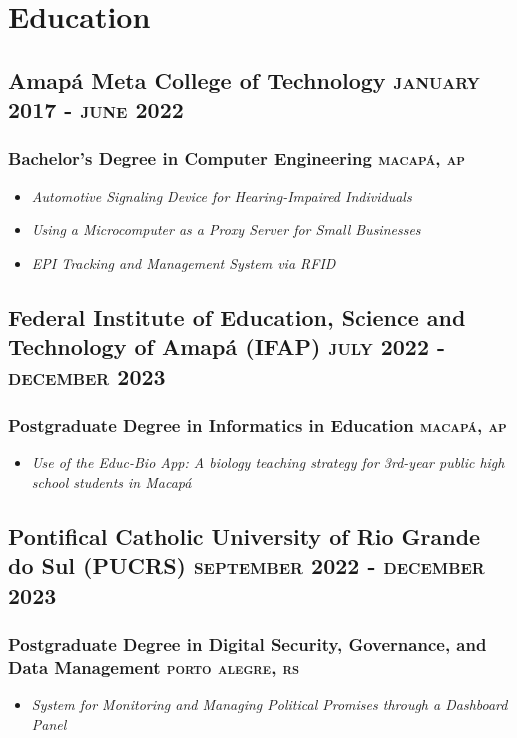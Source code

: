 \documentclass{article}
\newcommand{\rside}[1]{\hfill \normalfont\scshape\MakeLowercase{#1}}
\begin{document}
\section{\faGraduationCap\enspace Education}
\subsection{Amapá Meta College of Technology \rside{January 2017 - June 2022}}
\subsubsection{Bachelor’s Degree in Computer Engineering \rside{Macapá, AP}}
\begin{itemize}
  \item \textit{Automotive Signaling Device for Hearing-Impaired Individuals}
  \item \textit{Using a Microcomputer as a Proxy Server for Small Businesses}
  \item \textit{EPI Tracking and Management System via RFID}
\end{itemize}

\subsection{Federal Institute of Education, Science and Technology of Amapá (IFAP) \rside{July 2022 - December 2023}}
\subsubsection{Postgraduate Degree in Informatics in Education \rside{Macapá, AP}}
\begin{itemize}
  \item \textit{Use of the Educ-Bio App: A biology teaching strategy for 3rd-year public high school students in Macapá}
\end{itemize}

\subsection{Pontifical Catholic University of Rio Grande do Sul (PUCRS) \rside{September 2022 - December 2023}}
\subsubsection{Postgraduate Degree in Digital Security, Governance, and Data Management \rside{Porto Alegre, RS}}
\begin{itemize}
  \item \textit{System for Monitoring and Managing Political Promises through a Dashboard Panel}
\end{itemize}
\end{document}
